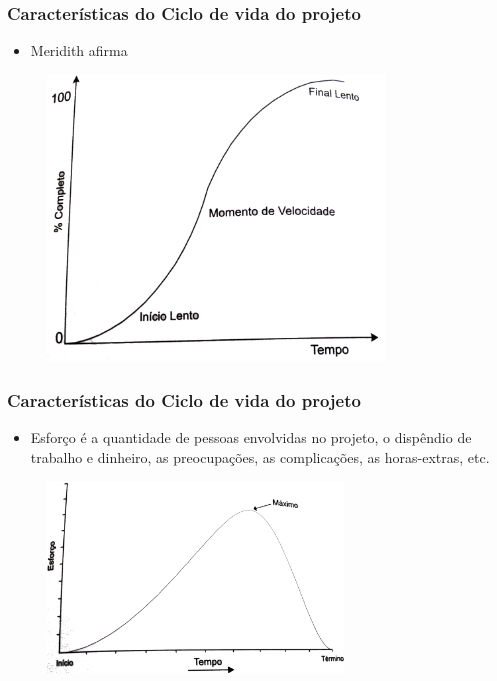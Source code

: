 \begin{frame}
 \frametitle{Características do Ciclo de vida do projeto}
 \begin{itemize}
  \item Meridith afirma
 \end{itemize}
\begin{figure}
 \centering
 \includegraphics[width = 0.8\textwidth]{figs/fig3.png}
\end{figure}
\end{frame}

\begin{frame}
 \frametitle{Características do Ciclo de vida do projeto}
\begin{itemize}
 \item Esforço é a quantidade de pessoas envolvidas no projeto, 
  o dispêndio de trabalho e dinheiro, as preocupações, as complicações, 
  as horas-extras, etc.
\end{itemize}
 \begin{figure}
 \centering
 \includegraphics[width = 0.7\textwidth]{figs/fig4.png}
\end{figure}
\end{frame}

